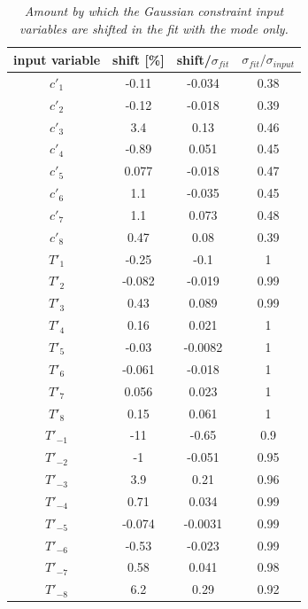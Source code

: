\begin{table}[!h]
	\begin{center}
		\begin{tabular}{c| c| c|c}
			input variable & \quad shift [\%] \quad & shift/$\sigma_{fit}$ & \quad $\sigma_{fit}/ \sigma_{input}$\\
			\hline
			\hline
$c'_1$ & -0.11 & -0.034 & 0.38\\ 
$c'_2$ & -0.12 & -0.018 & 0.39\\ 
$c'_3$ & 3.4 & 0.13 & 0.46\\ 
$c'_4$ & -0.89 & 0.051 & 0.45\\ 
$c'_5$ & 0.077 & -0.018 & 0.47\\ 
$c'_6$ & 1.1 & -0.035 & 0.45\\ 
$c'_7$ & 1.1 & 0.073 & 0.48\\ 
$c'_8$ & 0.47 & 0.08 & 0.39\\ 
$T'_1$ & -0.25 & -0.1 & 1\\ 
$T'_2$ & -0.082 & -0.019 & 0.99\\ 
$T'_3$ & 0.43 & 0.089 & 0.99\\ 
$T'_4$ & 0.16 & 0.021 & 1\\ 
$T'_5$ & -0.03 & -0.0082 & 1\\ 
$T'_6$ & -0.061 & -0.018 & 1\\ 
$T'_7$ & 0.056 & 0.023 & 1\\ 
$T'_8$ & 0.15 & 0.061 & 1\\ 
$T'_{-1}$ & -11 & -0.65 & 0.9\\ 
$T'_{-2}$ & -1 & -0.051 & 0.95\\ 
$T'_{-3}$ & 3.9 & 0.21 & 0.96\\ 
$T'_{-4}$ & 0.71 & 0.034 & 0.99\\ 
$T'_{-5}$ & -0.074 & -0.0031 & 0.99\\ 
$T'_{-6}$ & -0.53 & -0.023 & 0.99\\ 
$T'_{-7}$ & 0.58 & 0.041 & 0.98\\ 
$T'_{-8}$ & 6.2 & 0.29 & 0.92\\ 
\end{tabular}
\end{center}
\caption{\textit{Amount by which the Gaussian constraint input variables are shifted in the fit with the \KlPiPi mode only.}}
\end{table} 
\clearpage
